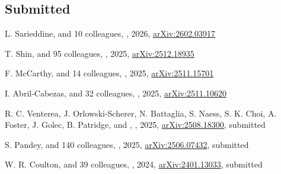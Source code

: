 

\subsection*{Submitted}

\begin{etaremune}

\item
L. Sarieddine, and 10 colleagues,
,
2026, \href{https://ui.adsabs.harvard.edu/abs/2026arXiv260203917S}{arXiv:2602.03917}

\item
T. Shin, and 95 colleagues,
,
2025, \href{https://ui.adsabs.harvard.edu/abs/2025arXiv251218935S}{arXiv:2512.18935}

\item
F. McCarthy, and 14 colleagues,
,
2025, \href{https://ui.adsabs.harvard.edu/abs/2025arXiv251115701M}{arXiv:2511.15701}

\item
I. Abril-Cabezas, and 32 colleagues,
,
2025, \href{https://ui.adsabs.harvard.edu/abs/2025arXiv251110620A}{arXiv:2511.10620}

\item
R. C. Venterea, J. Orlowski-Scherer, N. Battaglia, S. Naess, S. K. Choi, A. Foster, J. Golec, B. Patridge, and \myself,
,
2025, \href{https://ui.adsabs.harvard.edu/abs/2025arXiv250818300V}{arXiv:2508.18300},
submitted

\item
S. Pandey, and 140 colleagues,
,
2025, \href{https://ui.adsabs.harvard.edu/abs/2025arXiv250607432P}{arXiv:2506.07432},
submitted

\item
W. R. Coulton, and 39 colleagues,
,
2024, \href{https://ui.adsabs.harvard.edu/abs/2024arXiv240113033C}{arXiv:2401.13033},
submitted


\end{etaremune}

